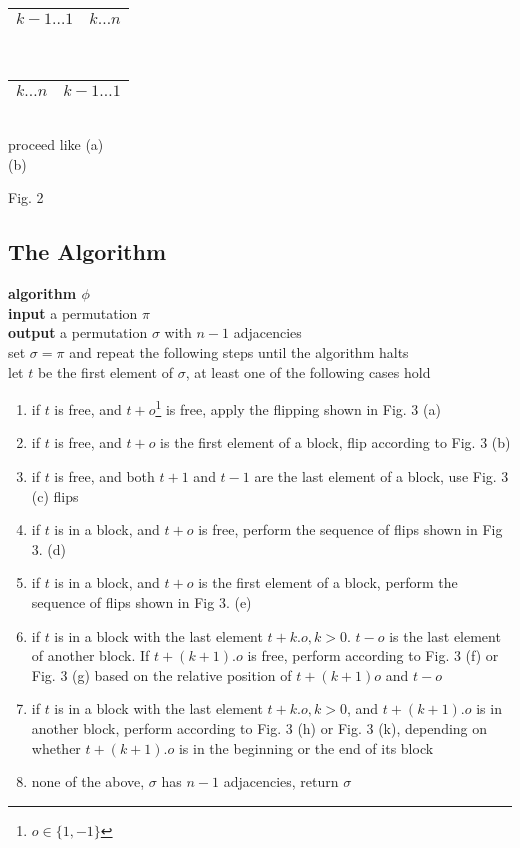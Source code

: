 \begin{minipage}[t]{0.5\textwidth}
\begin{center}
\begin{tabular}{ |c|c| } 
 \hline
 $k-1 \ldots 1$ & $k \ldots n$ \\
 \hline
\end{tabular}
\\
\begin{tabular}{ |c|c| } 
 \hline
 $k \ldots n$ & $k-1 \ldots 1$ \\ 
 \hline
\end{tabular}
\\
proceed like (a) \\
(b)
\end{center}
\end{minipage}

\begin{center}
    Fig. 2
\end{center}


\subsection{The Algorithm}
\textbf{algorithm $\phi$} \\ 
\textbf{input} a permutation $\pi$ \\  
\textbf{output} a permutation $\sigma$ with $n-1$ adjacencies\\ 
set $\sigma=\pi$ and repeat the following steps until the algorithm halts \\ 
let $t$ be the first element of $\sigma$, at least one of the following cases hold
\begin{enumerate}
\item if $t$ is free, and $t+o$\footnote{$o \in \{1, -1\} $} is free, apply the flipping shown in Fig. 3 (a)
\item if $t$ is free, and $t+o$ is the first element of a block, flip according to Fig. 3 (b)
\item if $t$ is free, and both $t+1$ and $t-1$ are the last element of a block, use Fig. 3 (c) flips
\item if $t$ is in a block, and $t+o$ is free, perform the sequence of flips shown in Fig 3. (d)
\item if $t$ is in a block, and $t+o$ is the first element of a block, perform the sequence of flips shown in Fig 3. (e) 
\item if $t$ is in a block with the last element $t + k.o, k>0$. $t-o$ is the last element of another block. If $t+(k+1).o$ is free, perform according to Fig. 3 (f) or Fig. 3 (g) based on the relative position of $t+(k+1)o$ and $t-o$ 
\item if $t$ is in a block with the last element $t + k.o, k>0$, and $t+(k+1).o$ is in another block, perform according to Fig. 3 (h) or Fig. 3 (k), depending on whether $t+(k+1).o$ is in the beginning or the end of its block 
\item none of the above, $\sigma$ has $n-1$ adjacencies, return $\sigma$ 
\end{enumerate} 

